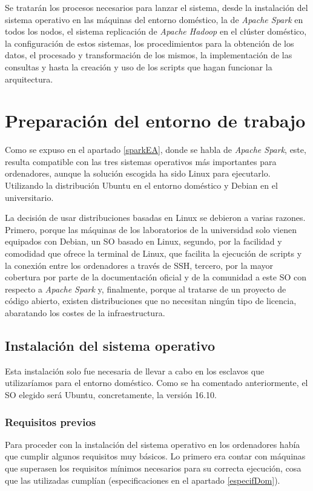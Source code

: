 Se tratarán los procesos necesarios para lanzar el sistema, desde la instalación del sistema operativo en las máquinas del entorno doméstico, la de \textit{Apache Spark} en todos los nodos, el sistema replicación de \textit{Apache Hadoop} en el clúster doméstico, la configuración de estos sistemas, los procedimientos para la obtención de los datos, el procesado y transformación de los mismos, la implementación de las consultas y hasta la creación y uso de los scripts que hagan funcionar la arquitectura.

\section{Preparación del entorno de trabajo}
Como se expuso en el apartado \ref{sparkEA}, donde se habla de \textit{Apache Spark}, este, resulta compatible con las tres sistemas operativos más importantes para ordenadores, aunque la solución escogida ha sido Linux para ejecutarlo. Utilizando la distribución Ubuntu \cite{ubuntu} en el entorno doméstico y Debian \cite{debian} en el universitario.

La decisión de usar distribuciones basadas en Linux se debieron a varias razones. Primero, porque las máquinas de los laboratorios de la universidad solo vienen equipados con Debian, un \gls{SO} basado en Linux, segundo, por la facilidad y comodidad que ofrece la terminal de Linux, que facilita la ejecución de scripts y la conexión entre los ordenadores a través de \gls{SSH}, tercero, por la mayor cobertura por parte de la documentación oficial y de la comunidad a este \gls{SO} con respecto a \textit{Apache Spark} y, finalmente, porque al tratarse de un proyecto de código abierto, existen distribuciones que no necesitan ningún tipo de licencia, abaratando los costes de la infraestructura.

\subsection{Instalación del sistema operativo}
Esta instalación solo fue necesaria de llevar a cabo en los esclavos que utilizaríamos para el entorno doméstico. Como se ha comentado anteriormente, el \gls{SO} elegido será Ubuntu, concretamente, la versión 16.10.

\subsubsection{Requisitos previos}
Para proceder con la instalación del sistema operativo en los ordenadores había que cumplir algunos requisitos muy básicos. Lo primero era contar con máquinas que superasen los requisitos mínimos \cite{ubuntu} necesarios para su correcta ejecución, cosa que las utilizadas cumplían (especificaciones en el apartado \ref{especifDom}).

